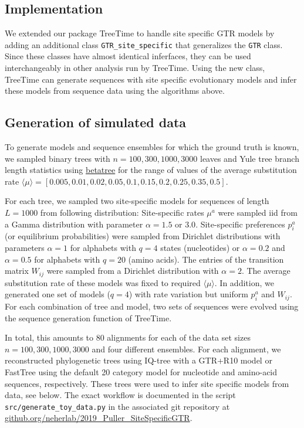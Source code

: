 \documentclass[aps,rmp,twocolumn]{revtex4}
\newcommand{\eqp}{p}
\begin{document}
\subsection*{Implementation}
We extended our package TreeTime \citep{sagulenko2017treetime} to handle site specific GTR models by adding an additional class \texttt{GTR\_site\_specific} that generalizes the \texttt{GTR} class.
Since these classes have almost identical inferfaces, they can be used interchangeably in other analysis run by TreeTime.
Using the new class, TreeTime can generate sequences with site specific evolutionary models and infer these models from sequence data using the algorithms above.



\subsection*{Generation of simulated data}
To generate models and sequence ensembles for which the ground truth is known, we sampled binary trees with $n=100, 300, 1000, 3000$ leaves and Yule tree branch length statistics using \href{https://github.com/neherlab/betatree}{betatree} \citep{neher2013coalescence} for the range of values of the average substitution rate $\langle \mu\rangle = [0.005, 0.01, 0.02, 0.05, 0.1, 0.15, 0.2, 0.25, 0.35, 0.5]$.

For each tree, we sampled two site-specific models for sequences of length $L=1000$ from following distribution:
Site-specific rates $\mu^a$ were sampled iid from a Gamma distribution with parameter $\alpha=1.5$ or $3.0$.
Site-specific preferences $\eqp_i^a$ (or equilibrium probabilities) were sampled from Dirichlet distributions with parameters $\alpha=1$ for alphabets with $q=4$ states (nucleotides) or $\alpha=0.2$ and $\alpha=0.5$ for alphabets with $q=20$ (amino acids).
The entries of the transition matrix $W_{ij}$ were sampled from a Dirichlet distribution with $\alpha=2$.
The average substitution rate of these models was fixed to required $\langle \mu\rangle$.
In addition, we generated one set of models ($q=4$) with rate variation but uniform $\eqp_i^a$ and $W_{ij}$.
For each combination of tree and model, two sets of sequences were evolved using the sequence generation function of TreeTime.

In total, this amounts to 80 alignments for each of the data set sizes $n=100,300,1000,3000$ and four different ensembles.
For each alignment, we reconstructed phylogenetic trees using IQ-tree \citep{nguyen_iq-tree:_2015} with a GTR+R10 model or FastTree \citep{FastTree} using the default 20 category model for nucleotide and amino-acid sequences, respectively.
These trees were used to infer site specific models from data, see below.
The exact workflow is documented in the script \texttt{src/generate\_toy\_data.py} in the associated git repository at \href{https://github.com/neherlab/2019_Puller_SiteSpecificGTR}{github.org/neherlab/2019\_Puller\_SiteSpecificGTR}.
\end{document}

